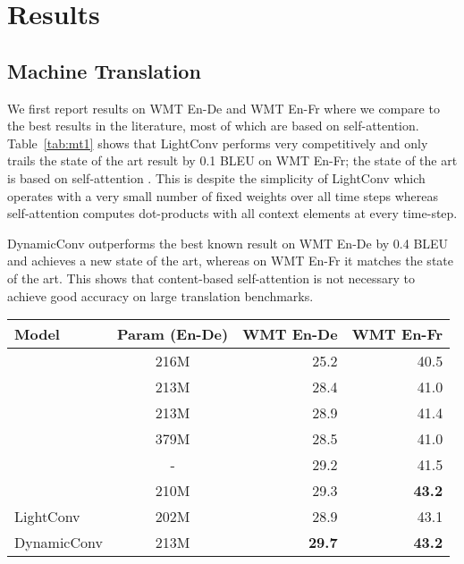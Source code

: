 \documentclass{article} \usepackage{iclr2019_conference,times}
\def\sdconv{LightConv}
\def\tvsdconv{DynamicConv}
\def\ende{WMT En-De}
\def\enfr{WMT En-Fr}
\begin{document}
\section{Results}\label{sec:results}
\subsection{Machine Translation}\label{sec:translation}

We first report results on \ende{} and \enfr{} where we compare to the best results in the literature, most of which are based on self-attention.
Table~\ref{tab:mt1} shows that \sdconv{} performs very competitively and only trails the state of the art result by 0.1 BLEU on \enfr{}; the state of the art is based on self-attention \citep{ott2018scaling}.
This is despite the simplicity of \sdconv{} which operates with a very small number of fixed weights over all time steps whereas self-attention computes dot-products with all context elements at every time-step.

\tvsdconv{} outperforms the best known result on \ende{} by 0.4 BLEU and achieves a new state of the art, whereas on \enfr{} it matches the state of the art.
This shows that content-based self-attention is not necessary to achieve good accuracy on large translation benchmarks.

\begin{table*}[t]
\centering
\begin{tabular}{lcrr}
\toprule
Model & Param (En-De) & \ende{} & \enfr{} \\
\midrule
\citet{gehring2017convs2s} & 216M & 25.2 & 40.5 \\
\citet{vaswani2017transformer} & 213M & 28.4 & 41.0 \\
\citet{ahmed2017WeightedTN} & 213M & 28.9 & 41.4 \\
\citet{chen2018arxiv} & 379M & 28.5 & 41.0 \\
\citet{shaw2018relpos}  & - & 29.2 & 41.5 \\
\citet{ott2018scaling} & 210M & 29.3 & \textbf{43.2} \\
\midrule
\sdconv{} & 202M & 28.9 & 43.1 \\
\tvsdconv{} & 213M & \textbf{29.7} & \textbf{43.2} \\
\bottomrule
\end{tabular}
\caption{Machine translation accuracy in terms of BLEU for \ende{} and \enfr{} on newstest2014.}
\label{tab:mt1}
\end{table*}
\end{document}
